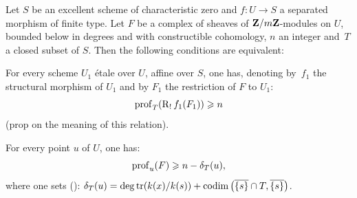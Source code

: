 \setcounter{subsection}{1}

\begin{theorem} \label{XIV.4.2}
Let $S$ be an excellent scheme of characteristic zero and \hbox{$f\colon U\!\to\! S$} a separated morphism of finite type. Let $F$ be a complex of sheaves of $\mathbf{Z}/m\mathbf{Z}$-modules on $U$, bounded below in degrees and with constructible cohomology, $n$ an integer and~$T$ a closed subset of $S$. Then the following conditions are equivalent:
\begin{enumeratei}
\item
For every scheme $U_{1}$ \'etale over $U$, affine over $S$, one has, denoting by~$f_{1}$ the structural morphism of $U_{1}$ and by $F_{1}$ the restriction of $F$ to $U_{1}$:
$$
\operatorname{prof}_{T}(\operatorname{R}_{!}f_{1}(F_{1}))\geqslant n$$
(\cf prop\ptbl {} on the meaning of this relation).
\item
For every point $u$ of $U$, one has:
$$
\operatorname{prof}_{u}(F)\geqslant n-\delta_{T}(u),
$$
where one sets (\cf {}): $\delta_{T}(u)=\operatorname{deg\,tr}(k(x)/k(s))+\operatorname{codim}\big(\overline{\{ s\} }\cap T, \overline{\{ s\} } \big)$.
\end{enumeratei}
\end{theorem}

